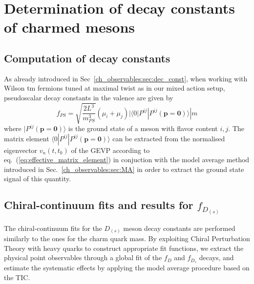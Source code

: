 

\section{Determination of decay constants of charmed mesons}
\label{sec:fDs}

\subsection{Computation of decay constants}

As already introduced in Sec~\ref{ch_observables:sec:dec_const}, when working with Wilson tm fermions tuned at maximal twist as in our mixed action setup, pseudoscalar decay constants in the valence are given by
\begin{equation}
	f_{PS} = \sqrt{\frac{2L^3}{m_{PS}^3}} (\mu_i+\mu_j) | \langle 0 | P^{ij} | P^{ij}(\mathbf{p=0})\rangle |m
	\label{eq:renormalised_decay_constant}
\end{equation}
where $| P^{ij}(\mathbf{p=0})\rangle$ is the ground state of a meson with flavor content $i,j$. The matrix element $ \langle 0 | P^{ij} | P^{ij}(\mathbf{p=0})\rangle $  can be extracted from the 
normalised eigenvector $v_n(t,t_0)$ of the GEVP  according to eq.~(\ref{eq:effective_matrix_element}) in conjuction with the model average method introduced in Sec.~\ref{ch_observables:sec:MA} in order to extract the ground state signal of this quantity.

\subsection{Chiral-continuum fits and results for $f_{D_{(s)}}$}

The chiral-continuum fits for the $D_{(s)}$ meson decay constants are performed similarly to the
ones for the charm quark mass. By exploiting Chiral Perturbation Theory with heavy quarks 
\cite{Grinstein:1992qt, Goity:1992tp} to construct appropriate fit functions, we 
extract the physical point observables through a global fit of the $f_D$ and $f_{D_s}$ decays,
and estimate the systematic effects by applying the model average procedure based on the TIC.

